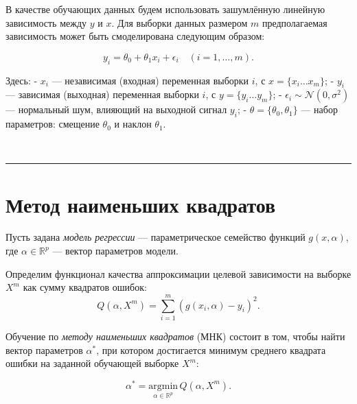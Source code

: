 \documentclass[11pt,a4paper]{article}
\renewcommand{\linethickness}{0.1ex}
\begin{document}
В качестве обучающих данных будем использовать зашумлённую линейную
зависимость между \(y\) и \(x\). Для выборки данных размером \(m\)
предполагаемая зависимость может быть смоделирована следующим образом:

\[ y_i = \theta_0 + \theta_1 x_i + \epsilon_i  \quad (i = 1, \ldots, m). \]

Здесь: - \(x_i\) --- независимая (входная) переменная выборки \(i\), с
\(x = \{x_i \ldots x_m \}\); - \(y_i\) --- зависимая (выходная)
переменная выборки \(i\), с \(y = \{y_i \ldots y_m \}\); -
\(\epsilon_i \sim \mathcal{N}(0, \sigma^2)\) --- нормальный шум,
влияющий на выходной сигнал \(y_i\); -
\(\theta = \{\theta_0, \theta_1 \}\) --- набор параметров: смещение
\(\theta_0\) и наклон \(\theta_1\).

    \begin{center}
    \end{center}
    { \hspace*{\fill} \\}
    
    \begin{center}\rule{0.5\linewidth}{\linethickness}\end{center}

    \hypertarget{ux43cux435ux442ux43eux434-ux43dux430ux438ux43cux435ux43dux44cux448ux438ux445-ux43aux432ux430ux434ux440ux430ux442ux43eux432}{%
\section{Метод наименьших
квадратов}\label{ux43cux435ux442ux43eux434-ux43dux430ux438ux43cux435ux43dux44cux448ux438ux445-ux43aux432ux430ux434ux440ux430ux442ux43eux432}}

Пусть задана \emph{модель регрессии} --- параметрическое семейство
функций \(g(x,\alpha)\), где \(\alpha \in \mathbb{R}^p\) --- вектор
параметров модели.

Определим функционал качества аппроксимации целевой зависимости на
выборке \(X^m\) как сумму квадратов ошибок:
\[ Q(\alpha, X^m) = \sum_{i=1}^m \left( g(x_i, \alpha) - y_i \right)^2. \]

Обучение по \emph{методу наименьших квадратов} (МНК) состоит в том,
чтобы найти вектор параметров \(\alpha^*\), при котором достигается
минимум среднего квадрата ошибки на заданной обучающей выборке \(X^m\):

\[ \alpha^* = \underset{\alpha \in \mathbb{R}^p}{\mathrm{argmin}} \, {Q(\alpha, X^m)}. \]
\end{document}
